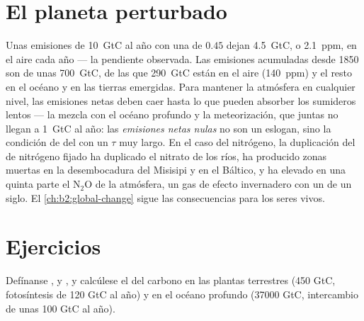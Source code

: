 \section{El planeta perturbado}

\begin{example}\label{ex:b2:biogeochemical-cycles:numbers}
Unas emisiones de \qty{10}{GtC} al año con una  de
$0.45$ dejan \qty{4.5}{GtC}, o \qty{2.1}{ppm}, en el aire cada año
--- la pendiente observada. Las emisiones acumuladas desde 1850 son de
unas \qty{700}{GtC}, de las que \qty{290}{GtC} están en el aire (140~ppm)
y el resto en el océano y en las tierras emergidas. Para mantener la
atmósfera en cualquier nivel, las emisiones netas deben caer hasta lo que
pueden absorber los sumideros lentos --- la mezcla con el océano profundo y
la meteorización, que juntas no llegan a \qty{1}{GtC} al año:
las \emph{emisiones netas nulas} no son un eslogan, sino la condición de
 del  con un $\tau$ muy largo. En el caso
del nitrógeno, la duplicación del  de nitrógeno fijado ha duplicado
el nitrato de los ríos, ha producido zonas muertas en la desembocadura
del Misisipi y en el Báltico, y ha elevado en una quinta parte el
$\mathrm{N_2O}$ de la atmósfera, un gas de efecto invernadero con un  de un siglo. El \cref{ch:b2:global-change} sigue las
consecuencias para los seres vivos.
\end{example}

\section{Ejercicios}

\begin{exercise}[$\star$]\label{exo:b2:biogeochemical-cycles:1}
Defínanse ,  y , y calcúlese el  del carbono en las plantas terrestres (450 GtC,
fotosíntesis de 120 GtC al año) y en el océano profundo (\num{37000} GtC,
intercambio de unas 100 GtC al año).
\end{exercise}

